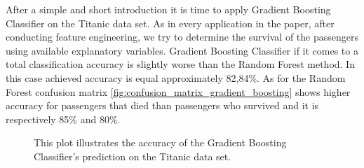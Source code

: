After a simple and short introduction it is time to apply Gradient Boosting Classifier on the Titanic data set. As in every application in the paper,
after conducting feature engineering, we try to determine the survival of the passengers using available explanatory variables. 
Gradient Boosting Classifier if it comes to a total classification accuracy is slightly worse than the Random Forest method. In this case achieved accuracy is equal
approximately 82,84\%. 
As for the Random Forest confusion matrix \autoref{fig:confusion_matrix_gradient_boosting} shows higher accuracy for passengers that died than passengers who survived and it is respectively 85\% and 80\%.

\begin{figure}[H]
\captionsetup{format=plain}
\caption
{This plot illustrates the accuracy of the Gradient Boosting Classifier's prediction on the Titanic data set.
}
\label{fig:confusion_matrix_gradient_boosting}
\end{figure}


